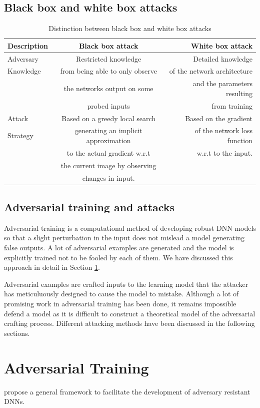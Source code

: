 \documentclass{article}
\begin{document}
\subsection*{Black box and white box attacks}
\begin{table}[h!]
	\centering
	\caption{Distinction between black box and white box attacks}
	\label{tab:table1}
	\begin{tabular}{l|c|r}
		Description & Black box attack & White box attack\\
		\hline
		Adversary & Restricted knowledge & Detailed knowledge \\Knowledge & from being able to only observe & of the network architecture\\&
		 the networks output on some  &
		 and the parameters resulting\\&probed inputs & from training\\
		Attack
		& Based on a greedy local search & Based on the gradient\\ Strategy & generating an implicit approximation &  of the network loss function \\&to the actual gradient w.r.t & w.r.t to the input.\\& the current image by observing\\& changes in input.
		 
	\end{tabular}
\end{table}

\subsection*{Adversarial training and attacks}
Adversarial training is a computational method of developing robust DNN models so that a slight perturbation in the input does not mislead a model generating false outputs. A lot of adversarial examples are generated and the model is explicitly trained not to be fooled by each of them. We have discussed this approach in detail in Section \ref{training}. 

Adversarial examples are crafted inputs to the learning model that the attacker has meticuluously designed to cause the model to mistake. Although a lot of promising work in adversarial training has been done, it remains impossible defend a model as it is difficult to construct a theoretical model of the adversarial crafting process. Different attacking methods have been discussed in the following sections. 

\section{Adversarial Training}\label{training}
\cite{wang2016learning} propose a general framework to facilitate the development of adversary resistant DNNs.
\end{document}
